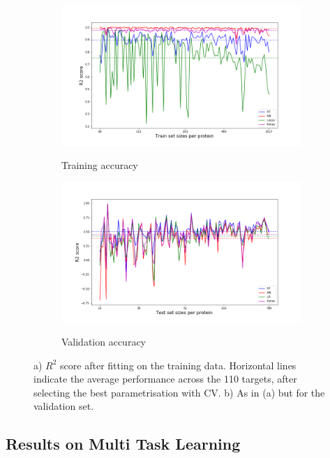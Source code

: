 \documentclass[10pt]{article}
\begin{document}
\begin{figure}
	\begin{subfigure}{.53\textwidth}
		\centering
		\caption{Training accuracy}
		\includegraphics[width=\textwidth]{figs/Train-all.png}
		\label{fig:train}
	\end{subfigure}
	\begin{subfigure}{.53\textwidth}
		\caption{Validation accuracy}
		\centering
		\includegraphics[width=\textwidth]{figs/Valid-all.png}
		\label{fig:valid}
	\end{subfigure}
\caption{{\small a) $R^2$ score after fitting on the training data. Horizontal lines indicate the average performance across the 110 targets, after selecting the best parametrisation with CV.  b) As in (a) but for the validation set.}}
\end{figure}


\subsection{Results on Multi Task Learning}
\end{document}
